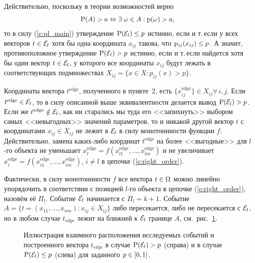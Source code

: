 \documentclass{article}
\begin{document}
Действительно, поскольку в теории возможностей верно
\begin{equation*}
  {\mathrm{P}}(A) > a \Leftrightarrow \exists\;\omega \in A: {\mathrm{p}}(\omega) > a,
\end{equation*}
то в силу (\ref{e:pl_main}) утверждение ${\mathrm{P}}(\mathcal{E}_l) \leq p$ истинно, если и т.\,если у всех векторов $t \in \mathcal{E}_l$ хотя бы одна координата $x_{ij}$ такова, что ${\mathrm{p}}_{ij}(x_{ij}) \leq p$. А значит, противоположное утверждение ${\mathrm{P}}(\mathcal{E}_l) > p$ истинно, если и т.\,если найдется хотя бы один вектор $t \in \mathcal{E}_l$, у которого все координаты $x_{ij} $ будут лежать в соответствующих подмножествах $X_{ij} = \{x \in X: p_{ij}(x) > p\}$. 

Координаты вектора $t^\text{edge}$, полученного в пункте~2, есть $\{x_{ij}^\text{edge}\} \in X_{ij} \forall\,i, j$.  
Если $t^\text{edge} \in \mathcal{E}_l$, то в силу описанной выше эквивалентности делается вывод ${\mathrm{P}}(\mathcal{E}_l) > p$. Если же $t^\text{edge} \notin \mathcal{E}_l$, как ни старались мы туда его <<запихнуть>> выбором самых <<невыгодных>> значений параметров, то и никакой другой вектор $t$ с координатами $x_{ij} \in X_{ij}$ не лежит в $\mathcal{E}_l$ в силу монотоннности функции $f$. Действительно, замена каких-либо координат $t^\text{edge}$ на более <<выгодные>> для $l$-го объекта не уменьшает $x_l^\text{edge} = f(x_{l1}^\text{edge}, ..., x_{lm}^\text{edge})$ и не увеличивает $x_i^\text{edge} = f(x_{i1}^\text{edge}, ..., x_{im}^\text{edge})$, $i \neq l$ в цепочке (\ref{e:right_order}).


Фактически, в силу монотоннности $f$ все вектора $t \in \Omega$ можно линейно упорядочить в соответствии с позицией $l$-го объекта в цепочке (\ref{e:right_order}), назовём её $\Pi_l$. Событие $\mathcal{E}_l$ начинается с $\Pi_l = k+1$. Событие $A = \{t = (x_{11}, ..., x_{nm}): x_{ij} \in X_{ij}\}$ либо пересекается, либо не пересекается с $\mathcal{E}_l$, но в любом случае $t_{edge}$ лежит на ближней к $\mathcal{E}_l$ границе $A$, см.~рис.~\ref{ris:algo_sets}. 

\begin{figure}[h]
\caption{\small Иллюстрация взаимного расположения исследуемых событий и построенного вектора $t_{edge}$ в случае ${\mathrm{P}}(\mathcal{E}_l) > p$ (справа) и в случае ${\mathrm{P}}(\mathcal{E}_l) \leq p$ (слева) для заданного $p \in [0,1]$.}
\label{ris:algo_sets}
\end{figure}
\end{document}
